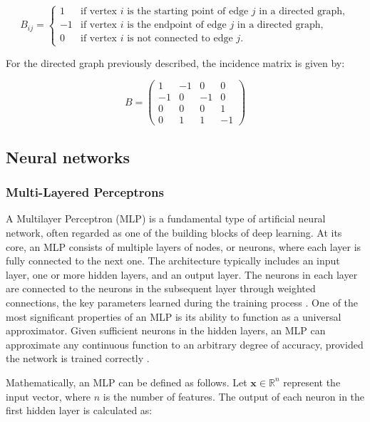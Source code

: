 \begin{equation}
 B_{ij} =
\begin{cases}
1 & \text{if vertex } i \text{ is the starting point of edge } j \text{ in a directed graph}, \\
-1 & \text{if vertex } i \text{ is the endpoint of edge } j \text{ in a directed graph}, \\
0 & \text{if vertex } i \text{ is not connected to edge } j.
\end{cases}  
    \label{eq:incidence_matrix_definition}
\end{equation}


For the directed graph previously described, the incidence matrix is given by:

\[
B = \begin{pmatrix}
1 & -1 & 0 & 0 \\
-1 & 0 & -1 & 0 \\
0 & 0 & 0 & 1  \\
0 & 1 & 1 & -1 
\end{pmatrix}
\]

\subsection{Neural networks}

\subsubsection{Multi-Layered Perceptrons}

    A Multilayer Perceptron (MLP) is a fundamental type of artificial neural network, often regarded as one of the building blocks of deep learning. At its core, an MLP consists of multiple layers of nodes, or neurons, where each layer is fully connected to the next one. The architecture typically includes an input layer, one or more hidden layers, and an output layer. The neurons in each layer are connected to the neurons in the subsequent layer through weighted connections, the key parameters learned during the training process \cite{Hippert_Pedreira_Souza_2001}. One of the most significant properties of an MLP is its ability to function as a universal approximator. Given sufficient neurons in the hidden layers, an MLP can approximate any continuous function to an arbitrary degree of accuracy, provided the network is trained correctly \cite{Zhang_Eddy_Patuwo_Y_Hu_1998}.

Mathematically, an MLP can be defined as follows. Let $\mathbf{x} \in \mathbb{R}^n$ represent the input vector, where $n$ is the number of features. The output of each neuron in the first hidden layer is calculated as:

